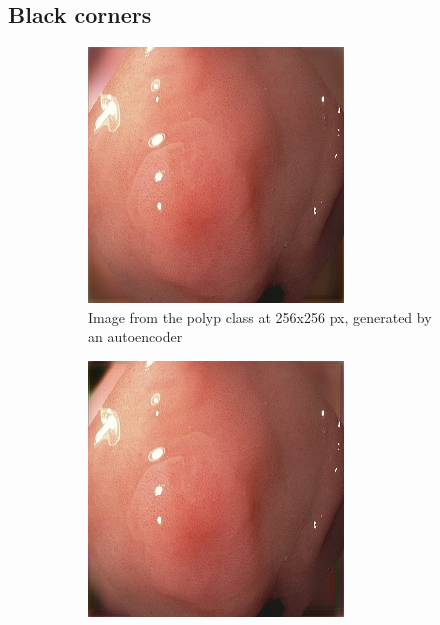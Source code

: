     \subsection{Black corners}
        \begin{figure}[t]
        \centering
        \begin{subfigure}[b]{0.4\textwidth}
            \centering
            \includegraphics[width=\textwidth]{experiments/figures/blackcorner/polypAE.jpg}
            \caption[Is this in use]%
            {{\small Image from the polyp class at 256x256 px, generated by an autoencoder }}    
            \label{fig:polypAEBLACK}
        \end{subfigure}
        \qquad
        \begin{subfigure}[b]{0.4\textwidth}  
            \centering 
            \includegraphics[width=\textwidth]{experiments/figures/blackcorner/polypGAN.jpg}

\end{subfigure}
\end{figure}

